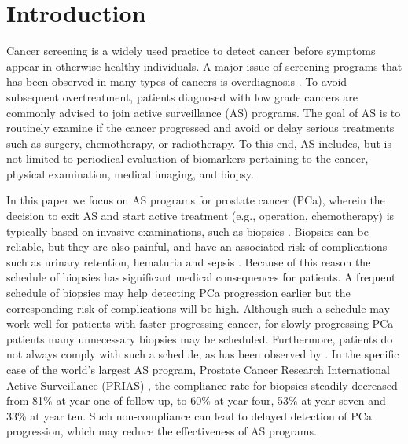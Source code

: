 \section{Introduction}
\label{sec : introduction}
Cancer screening is a widely used practice to detect cancer before symptoms appear in otherwise healthy individuals. A major issue of screening programs that has been observed in many types of cancers is overdiagnosis \citep{esserman2014addressing}. To avoid subsequent overtreatment, patients diagnosed with low grade cancers are commonly advised to join active surveillance (AS) programs. The goal of AS is to routinely examine if the cancer progressed and avoid or delay serious treatments such as surgery, chemotherapy, or radiotherapy. To this end, AS includes, but is not limited to periodical evaluation of biomarkers pertaining to the cancer, physical examination, medical imaging, and biopsy.

In this paper we focus on AS programs for prostate cancer (PCa), wherein the decision to exit AS and start active treatment (e.g., operation, chemotherapy) is typically based on invasive examinations, such as biopsies \citep{bokhorst2016decade}. Biopsies can be reliable, but they are also painful, and have an associated risk of complications such as urinary retention, hematuria and sepsis \citep{loeb2013systematic}. Because of this reason the schedule of  biopsies has significant medical consequences for patients. A frequent schedule of biopsies may help detecting PCa progression earlier but the corresponding risk of complications will be high. Although such a schedule may work well for patients with faster progressing cancer, for slowly progressing PCa patients many unnecessary biopsies may be scheduled. Furthermore, patients do not always comply with such a schedule, as has been observed by \citet{bokhorst2015compliance}. In the specific case of the world's largest AS program, Prostate Cancer Research International Active Surveillance (PRIAS) \citep{bokhorst2016decade}, the compliance rate for biopsies steadily decreased from 81\% at year one of follow up, to 60\% at year four, 53\% at year seven and 33\% at year ten. Such non-compliance can lead to delayed detection of PCa progression, which may reduce the effectiveness of AS programs.

